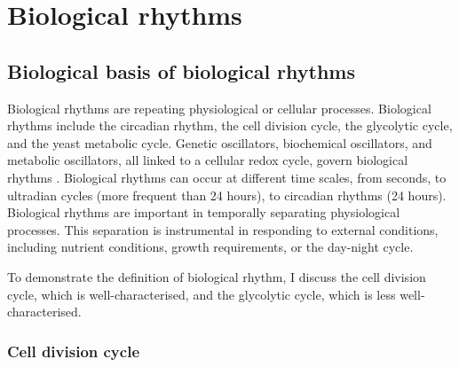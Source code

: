 \section{Biological rhythms}
\label{sec:intro-biological_rhythms}

\subsection{Biological basis of biological rhythms}
\label{subsec:intro-biological_rhythms-biological_basis}

Biological rhythms are repeating physiological or cellular processes.
Biological rhythms include the circadian rhythm, the cell division cycle, the glycolytic cycle, and the yeast metabolic cycle.
Genetic oscillators, biochemical oscillators, and metabolic oscillators, all linked to a cellular redox cycle, govern biological rhythms \parencite{mellorMolecularBasisMetabolic2016}.
Biological rhythms can occur at different time scales, from seconds, to ultradian cycles (more frequent than 24 hours), to circadian rhythms (24 hours).
Biological rhythms are important in temporally separating physiological processes.
This separation is instrumental in responding to external conditions, including nutrient conditions, growth requirements, or the day-night cycle.

To demonstrate the definition of biological rhythm, I discuss the cell division cycle, which is well-char\-ac\-terised, and the glycolytic cycle, which is less well-characterised.


\subsubsection{Cell division cycle}
\label{subsubsec:intro-cdc}

